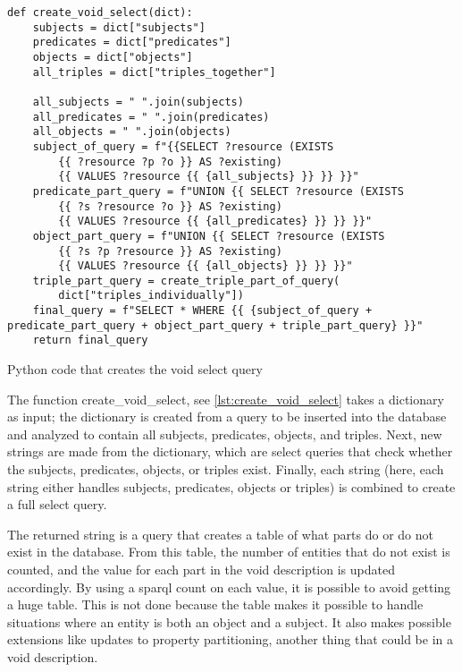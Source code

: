\begin{listing}[htb!]
    \begin{verbatim}
def create_void_select(dict):
    subjects = dict["subjects"]
    predicates = dict["predicates"]
    objects = dict["objects"]
    all_triples = dict["triples_together"]

    all_subjects = " ".join(subjects)
    all_predicates = " ".join(predicates)
    all_objects = " ".join(objects)
    subject_of_query = f"{{SELECT ?resource (EXISTS 
        {{ ?resource ?p ?o }} AS ?existing) 
        {{ VALUES ?resource {{ {all_subjects} }} }} }}"
    predicate_part_query = f"UNION {{ SELECT ?resource (EXISTS 
        {{ ?s ?resource ?o }} AS ?existing)
        {{ VALUES ?resource {{ {all_predicates} }} }} }}"
    object_part_query = f"UNION {{ SELECT ?resource (EXISTS
        {{ ?s ?p ?resource }} AS ?existing) 
        {{ VALUES ?resource {{ {all_objects} }} }} }}"
    triple_part_query = create_triple_part_of_query(
        dict["triples_individually"])
    final_query = f"SELECT * WHERE {{ {subject_of_query + predicate_part_query + object_part_query + triple_part_query} }}"
    return final_query
    \end{verbatim}
    \caption{Python code that creates the \gls{void} select query}
    \label{lst:create_void_select}
\end{listing}

The function create\_void\_select, see \autoref{lst:create_void_select} takes a dictionary as input; the dictionary is created from a query to be inserted into the database and analyzed to contain all subjects, predicates, objects, and triples. Next, new strings are made from the dictionary, which are select queries that check whether the subjects, predicates, objects, or triples exist. Finally, each string (here, each string either handles subjects, predicates, objects or triples) is combined to create a full select query.

The returned string is a query that creates a table of what parts do or do not exist in the database. From this table, the number of entities that do not exist is counted, and the value for each part in the \gls{void} description is updated accordingly. By using a \gls{sparql} count on each value, it is possible to avoid getting a huge table. This is not done because the table makes it possible to handle situations where an entity is both an object and a subject. It also makes possible extensions like updates to property partitioning, another thing that could be in a void description.

